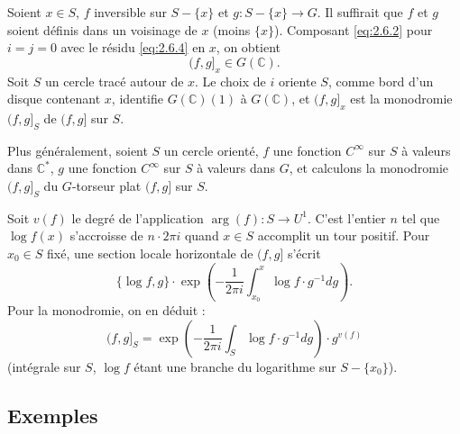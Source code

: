 \documentclass[12pt,a4paper]{article}
\theoremstyle{plain}
\theoremstyle{definition}
\theoremstyle{remark}
\newcommand{\C}{\mathbb{C}}
\begin{document}
Soient $x \in S$, $f$ inversible sur $S - \{x\}$ et $g : S - \{x\} \to G$. Il suffirait que $f$
et $g$ soient définis dans un voisinage de $x$ (moins $\{x\}$). Composant \eqref{eq:2.6.2} pour $i = j = 0$
avec le résidu \eqref{eq:2.6.4} en $x$, on obtient
\begin{equation}\label{eq:2.7.1}
(f,g]_x \in G(\C).
\end{equation}
Soit $S$ un cercle tracé autour de $x$. Le choix de $i$ oriente $S$, comme bord d'un
disque contenant $x$, identifie $G(\C)(1)$ à $G(\C)$, et $(f,g]_x$ est la monodromie $(f,g]_S$
de $(f,g]$ sur $S$.

Plus généralement, soient $S$ un cercle orienté, $f$ une fonction $C^\infty$ sur $S$ à valeurs
dans $\C^*$, $g$ une fonction $C^\infty$ sur $S$ à valeurs dans $G$, et calculons la monodromie $(f,g]_S$
du $G$-torseur plat $(f,g]$ sur $S$.

Soit $v(f)$ le degré de l'application $\arg(f) : S \to U^1$. C'est l'entier $n$ tel que $\log f(x)$
s'accroisse de $n \cdot 2\pi i$ quand $x \in S$ accomplit un tour positif. Pour $x_0 \in S$ fixé, une section
locale horizontale de $(f,g]$ s'écrit
\[
\{\log f, g\} \cdot \exp\left(-\frac{1}{2\pi i} \int_{x_0}^x \log f \cdot g^{-1}dg\right).
\]
Pour la monodromie, on en déduit :
\begin{equation}\label{eq:2.7.2}
(f,g]_S = \exp\left(-\frac{1}{2\pi i} \int_S \log f \cdot g^{-1}dg\right) \cdot g^{v(f)}
\end{equation}
(intégrale sur $S$, $\log f$ étant une branche du logarithme sur $S - \{x_0\}$).

\subsection{Exemples}
\end{document}
